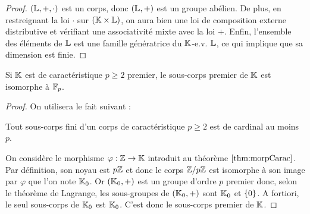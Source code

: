 \begin{proof}
$(\mathbb{L}, +, \cdot)$ est un corps, donc $(\mathbb{L}, +)$ est un groupe abélien.  De plus, en restreignant la loi $\cdot$ sur $(\mathbb{K} \times \mathbb{L})$, 
on aura bien une loi de composition externe distributive et vérifiant une associativité mixte avec la loi $+$.
Enfin, l'ensemble des éléments de $\mathbb{L}$ est une famille génératrice du $\mathbb{K}$-e.v. $\mathbb{L}$, ce qui implique que sa dimension est finie.
\end{proof}

\begin{lem}
\label{lem:isoFp}
Si $\mathbb{K}$ est de caractéristique $p \geq 2$ premier, le sous-corps premier de $\mathbb{K}$ est isomorphe à $\mathbb{F}_p$.
\end{lem}

\begin{proof}
On utilisera le fait suivant :

\begin{fait}
Tout sous-corps fini d'un corps de caractéristique $p \geq 2$ est de cardinal au moins $p$.
\end{fait}

On considère le morphisme $\varphi : \mathbb{Z} \to \mathbb{K}$ introduit au théorème $\ref{thm:morpCarac}$. 
Par définition, son noyau est $p \mathbb{Z}$ et donc le corps $\mathbb{Z} / p \mathbb{Z}$ est isomorphe à son image par $\varphi$ que l'on note $\mathbb{K}_0$.
Or $(\mathbb{K}_0, +)$ est un groupe d'ordre $p$ premier donc, selon le théorème de Lagrange, les sous-groupes de $(\mathbb{K}_0, +)$ sont $\mathbb{K}_0$
et $\{ 0 \}$. A fortiori, le seul sous-corps de $\mathbb{K}_0$ est $\mathbb{K}_0$. C'est donc le sous-corps premier de $\mathbb{K}$.
\end{proof}

%
%

%

